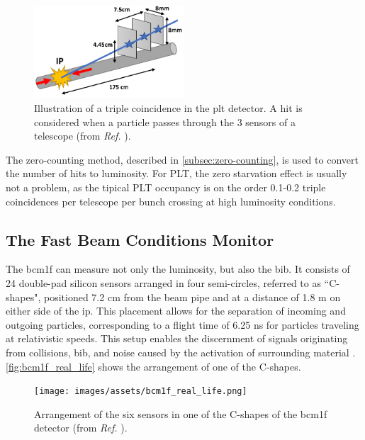 \begin{figure}[H]
	\centering
	\includegraphics[width=0.5\textwidth]{images/assets/TripleCoincidenceSketch.pdf}
	\caption[Triple coincidence in PLT]{Illustration of a triple coincidence in the \acrshort{plt} detector. A hit is considered when a particle passes through the 3 sensors of a telescope (from \textit{Ref.} \cite{Lujan:2797692}).}
	\label{fig:plt_triple_coincidence}
\end{figure}

The zero-counting method, described in \autoref{subsec:zero-counting}, is used to convert the number of hits to luminosity. For PLT, the zero starvation effect is usually not a problem, as the tipical PLT occupancy is on the order 0.1-0.2 triple coincidences per telescope per bunch crossing at high luminosity conditions.

\subsection{The Fast Beam Conditions Monitor}

The \acrfull{bcm1f} \cite{CMS-DP-2022-033} can measure not only the luminosity, but also the \acrshort{bib}. It consists of 24 double-pad silicon sensors arranged in four semi-circles, referred to as ``C-shapes", positioned 7.2 cm from the beam pipe and at a distance of 1.8 m on either side of the \acrshort{ip}. This placement allows for the separation of incoming and outgoing particles, corresponding to a flight time of 6.25 ns for particles traveling at relativistic speeds. This setup enables the discernment of signals originating from collisions, \acrshort{bib}, and noise caused by the activation of surrounding material \cite{Zagozdzinska_2016}. \autoref{fig:bcm1f_real_life} shows the arrangement of one of the C-shapes.

\begin{figure}[h]
\centering
\texttt{[image: images/assets/bcm1f\_real\_life.png]}
\caption[BCM1F sensor arrangement]{Arrangement of the six sensors in one of the C-shapes of the \acrshort{bcm1f} detector (from \textit{Ref.} \cite{DelannoySotomayor:2809025}).}
\label{fig:bcm1f_real_life}
\end{figure}

